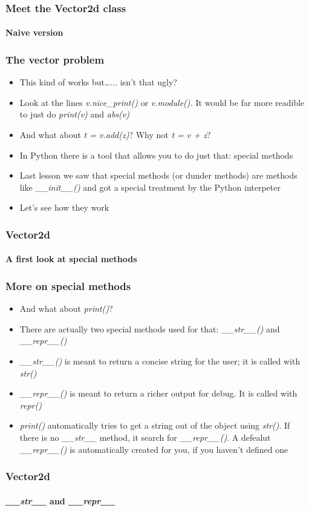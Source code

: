 \documentclass[9pt]{beamer}
\begin{document}
\begin{frame}
  \frametitle{Meet the Vector2d class}
  \framesubtitle{Naive version}
  
\end{frame}


\begin{frame}
  \frametitle{The vector problem}
  
  \begin{itemize}
    \item This kind of works but\dots... isn't that ugly?
    \medskip
    \item Look at the lines \emph{v.nice\_print()} or \emph{v.module().}
          It would be far more readible to just do \emph{print(v)} and \emph{abs(v)}
    \medskip
    \item And what about \emph{t = v.add(z)}? Why not \emph{t = v + z}?
    \medskip
    \item In Python there is a tool that allows you to do just that: \alert{special methods}
    \medskip
    \item Last lesson we saw that special methods (or dunder methods) are
          methods like \emph{\_\_init\_\_()} and got a special treatment 
          by the Python interpeter
    \medskip
    \item Let's see how they work
  \end{itemize}
  
\end{frame}

  
\begin{frame}
  \frametitle{Vector2d}
  \framesubtitle{A first look at special methods}
  
\end{frame}


\begin{frame}
  \frametitle{More on special methods}
  
  \begin{itemize}
    \item And what about \emph{print()}?
    \item There are actually two special methods used for that: \emph{\_\_str\_\_()} and \emph{\_\_repr\_\_()}
    \medskip
    \item \emph{\_\_str\_\_()} is meant to return a concise string for the user; it is called with \emph{str()}
    \medskip
    \item \emph{\_\_repr\_\_()} is meant to return a richer output for debug. It is called with \emph{repr()}
    \medskip
    \item \emph{print()} automatically tries to get a string out of the object using \emph{str()}. If there is
          no \emph{\_\_str\_\_} method, it search for \emph{\_\_repr\_\_()}. A defealut \emph{\_\_repr\_\_()}
          is automatically created for you, if you haven't defined one 
  \end{itemize}
  
\end{frame}


\begin{frame}
  \frametitle{Vector2d}
  \framesubtitle{\emph{\_\_str\_\_} and \emph{\_\_repr\_\_}}
  
\end{frame}
\end{document}
